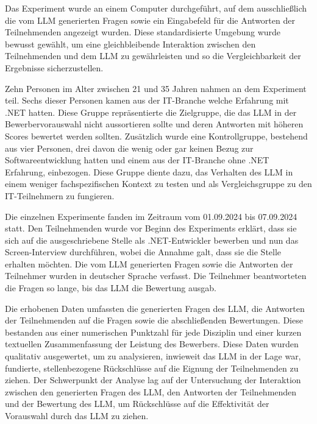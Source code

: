Das Experiment wurde an einem Computer durchgeführt, auf dem ausschließlich die vom \acs{LLM} 
generierten Fragen sowie ein Eingabefeld für die Antworten der Teilnehmenden angezeigt wurden. 
Diese standardisierte Umgebung wurde bewusst gewählt, um eine gleichbleibende Interaktion zwischen 
den Teilnehmenden und dem \acs{LLM} zu gewährleisten und so die Vergleichbarkeit der Ergebnisse 
sicherzustellen. 


Zehn Personen im Alter zwischen 21 und 35 Jahren nahmen an dem Experiment teil. 
Sechs dieser Personen kamen aus der IT-Branche welche Erfahrung mit .NET hatten. Diese Gruppe 
repräsentierte die Zielgruppe, die das \acs{LLM} in der Bewerbervorauswahl nicht aussortieren sollte und 
deren Antworten mit höheren Scores bewertet werden sollten. Zusätzlich wurde eine Kontrollgruppe, 
bestehend aus vier Personen, drei davon die wenig oder gar keinen Bezug zur Softwareentwicklung hatten und einem aus der IT-Branche ohne .NET Erfahrung, einbezogen. 
Diese Gruppe diente dazu, das Verhalten des \acs{LLM} in einem weniger fachspezifischen Kontext zu 
testen und als Vergleichsgruppe zu den IT-Teilnehmern zu fungieren. 


Die einzelnen Experimente fanden im Zeitraum vom 01.09.2024 bis 07.09.2024 statt. Den 
Teilnehmenden wurde vor Beginn des Experiments erklärt, dass sie sich auf die ausgeschriebene 
Stelle als .NET-Entwickler bewerben und nun das Screen-Interview durchführen, wobei die Annahme 
galt, dass sie die Stelle erhalten möchten. Die vom \acs{LLM} generierten Fragen sowie die Antworten der 
Teilnehmer wurden in deutscher Sprache verfasst. Die Teilnehmer beantworteten die Fragen so lange, 
bis das \acs{LLM} die Bewertung ausgab. 


Die erhobenen Daten umfassten die generierten Fragen des \acs{LLM}, die Antworten der Teilnehmenden auf 
die Fragen sowie die abschließenden Bewertungen. Diese bestanden aus einer numerischen Punktzahl 
für jede Disziplin und einer kurzen textuellen Zusammenfassung der Leistung des Bewerbers. 
Diese Daten wurden qualitativ ausgewertet, um zu analysieren, inwieweit das \acs{LLM} in der Lage war, 
fundierte, stellenbezogene Rückschlüsse auf die Eignung der Teilnehmenden zu ziehen. Der 
Schwerpunkt der Analyse lag auf der Untersuchung der Interaktion zwischen den generierten Fragen 
des \acs{LLM}, den Antworten der Teilnehmenden und der Bewertung des \acs{LLM}, um Rückschlüsse auf die 
Effektivität der Vorauswahl durch das \acs{LLM} zu ziehen. 






